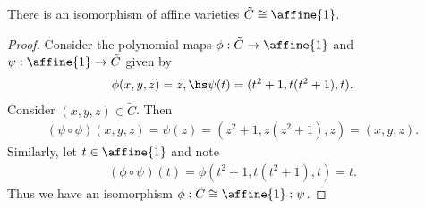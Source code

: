 \documentclass{article}
\begin{document}
\begin{claim*}[3a]
  There is an isomorphism of affine varieties $\tilde C\cong\affine{1}$.
  \begin{proof}
    Consider the polynomial maps $\phi:\tilde C\to\affine{1}$ and
    $\psi:\affine{1}\to\tilde C$ given by
    \begin{align*}
      \phi(x,y,z)=z, \hs \psi(t)=(t^2+1,t(t^2+1),t).
    \end{align*}
    Consider $(x,y,z)\in\tilde C$. Then
    \begin{align*}
      (\psi\circ\phi)(x,y,z) = \psi(z) = (z^2 + 1,z(z^2+1),z) = (x,y,z).
    \end{align*}
    Similarly, let $t\in\affine{1}$ and note
    \begin{align*}
      (\phi\circ\psi)(t) = \phi(t^2+1,t(t^2+1),t) = t.
    \end{align*}
    Thus we have an isomorphism $\phi : \tilde C \cong \affine{1} : \psi$.
  \end{proof}
\end{claim*}
\end{document}

